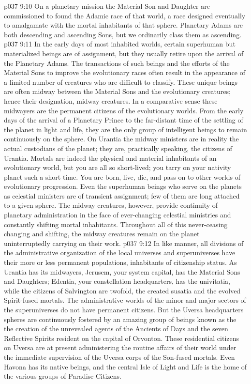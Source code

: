 \vs p037 9:10 On a planetary mission the Material Son and Daughter are commissioned to found the Adamic race of that world, a race designed eventually to amalgamate with the mortal inhabitants of that sphere. Planetary Adams are both descending and ascending Sons, but we ordinarily class them as ascending.
\vs p037 9:11 \pc {} In the early days of most inhabited worlds, certain superhuman but materialized beings are of assignment, but they usually retire upon the arrival of the Planetary Adams. The transactions of such beings and the efforts of the Material Sons to improve the evolutionary races often result in the appearance of a limited number of creatures who are difficult to classify. These unique beings are often midway between the Material Sons and the evolutionary creatures; hence their designation, midway creatures. In a comparative sense these midwayers are the permanent citizens of the evolutionary worlds. From the early days of the arrival of a Planetary Prince to the far\hyp{}distant time of the settling of the planet in light and life, they are the only group of intelligent beings to remain continuously on the sphere. On Urantia the midway ministers are in reality the actual custodians of the planet; they are, practically speaking, the citizens of Urantia. Mortals are indeed the physical and material inhabitants of an evolutionary world, but you are all so short\hyp{}lived; you tarry on your nativity planet such a short time. You are born, live, die, and pass on to other worlds of evolutionary progression. Even the superhuman beings who serve on the planets as celestial ministers are of transient assignment; few of them are long attached to a given sphere. The midway creatures, however, provide continuity of planetary administration in the face of ever\hyp{}changing celestial ministries and constantly shifting mortal inhabitants. Throughout all of this never\hyp{}ceasing changing and shifting, the midway creatures remain on the planet uninterruptedly carrying on their work.
\vs p037 9:12 \pc In like manner, all divisions of the administrative organization of the local universes and superuniverses have their more or less permanent populations, inhabitants of citizenship status. As Urantia has its midwayers, Jerusem, your system capital, has the Material Sons and Daughters; Edentia, your constellation headquarters, has the univitatia, while the citizens of Salvington are twofold, the created susatia and the evolved Spirit\hyp{}fused mortals. The administrative worlds of the minor and major sectors of the superuniverses do not have permanent citizens. But the Uversa headquarters spheres are continuously fostered by an amazing group of beings known as the  the creation of the unrevealed agents of the Ancients of Days and the seven Reflective Spirits resident on the capital of Orvonton. These residential citizens on Uversa are at present administering the routine affairs of their world under the immediate supervision of the Uversa corps of the Son\hyp{}fused mortals. Even Havona has its native beings, and the central Isle of Light and Life is the home of the various groups of Paradise Citizens.
